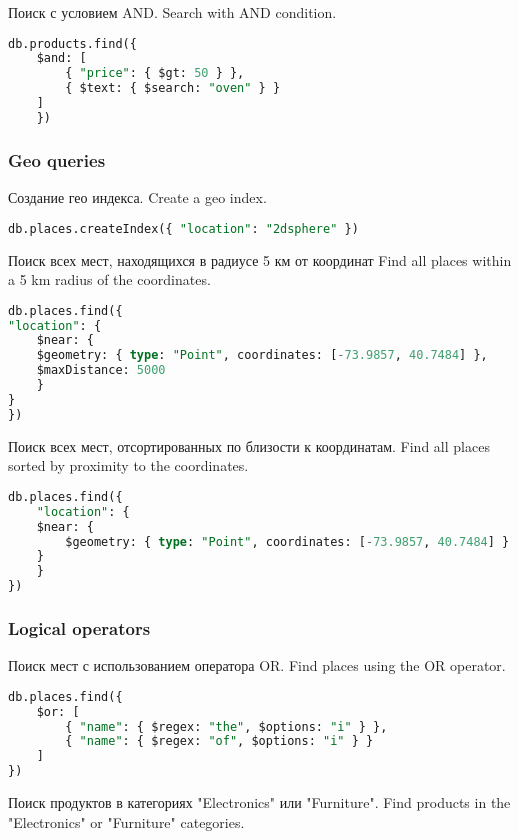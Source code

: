 \documentclass[a4paper,12pt]{article}
\begin{document}
Поиск с условием AND.
\newline
Search with AND condition.
\begin{lstlisting}[language=SQL]
db.products.find({
    $and: [
        { "price": { $gt: 50 } },
        { $text: { $search: "oven" } }
    ]
    })
\end{lstlisting}

\subsubsection{Geo queries}
Создание гео индекса.
\newline
Create a geo index.
\begin{lstlisting}[language=SQL]
db.places.createIndex({ "location": "2dsphere" })
\end{lstlisting}

Поиск всех мест, находящихся в радиусе 5 км от координат
\newline
Find all places within a 5 km radius of the coordinates.
\begin{lstlisting}[language=SQL]
db.places.find({
"location": {
    $near: {
    $geometry: { type: "Point", coordinates: [-73.9857, 40.7484] },
    $maxDistance: 5000  
    }
}
})
\end{lstlisting}
Поиск всех мест, отсортированных по близости к координатам.
\newline 
Find all places sorted by proximity to the coordinates.
\begin{lstlisting}[language=SQL]
db.places.find({
    "location": {
    $near: {
        $geometry: { type: "Point", coordinates: [-73.9857, 40.7484] }
    }
    }
})
\end{lstlisting}

\subsubsection{Logical operators}
Поиск мест с использованием оператора OR.
\newline
Find places using the OR operator.

\begin{lstlisting}[language=SQL]
db.places.find({
    $or: [
        { "name": { $regex: "the", $options: "i" } },
        { "name": { $regex: "of", $options: "i" } }
    ]
})
\end{lstlisting}

Поиск продуктов в категориях "Electronics" или "Furniture".
\newline
Find products in the "Electronics" or "Furniture" categories.
\end{document}
